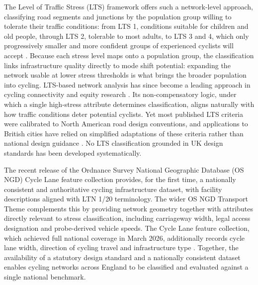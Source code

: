The Level of Traffic Stress (LTS) framework offers such a network-level approach, classifying road segments and junctions by the population group willing to tolerate their traffic conditions: from LTS 1, conditions suitable for children and old people, through LTS 2, tolerable to most adults, to LTS 3 and 4, which only progressively smaller and more confident groups of experienced cyclists will accept \parencite{mekuria2012a}. Because each stress level maps onto a population group, the classification links infrastructure quality directly to mode shift potential: expanding the network usable at lower stress thresholds is what brings the broader population into cycling. LTS-based network analysis has since become a leading approach in cycling connectivity and equity research \parencite{louro2026}. Its non-compensatory logic, under which a single high-stress attribute determines classification, aligns naturally with how traffic conditions deter potential cyclists. Yet most published LTS criteria were calibrated to North American road design conventions, and applications to British cities have relied on simplified adaptations of these criteria rather than national design guidance \parencite{cervero2019,jeong2025}. No LTS classification grounded in UK design standards has been developed systematically.

The recent release of the Ordnance Survey National Geographic Database (OS NGD) Cycle Lane feature collection provides, for the first time, a nationally consistent and authoritative cycling infrastructure dataset, with facility descriptions aligned with LTN 1/20 terminology. The wider OS NGD Transport Theme complements this by providing network geometry together with attributes directly relevant to stress classification, including carriageway width, legal access designation and probe-derived vehicle speeds. The Cycle Lane feature collection, which achieved full national coverage in March 2026, additionally records cycle lane width, direction of cycling travel and infrastructure type \parencite{ordnancesurvey2026e}. Together, the availability of a statutory design standard and a nationally consistent dataset enables cycling networks across England to be classified and evaluated against a single national benchmark.

